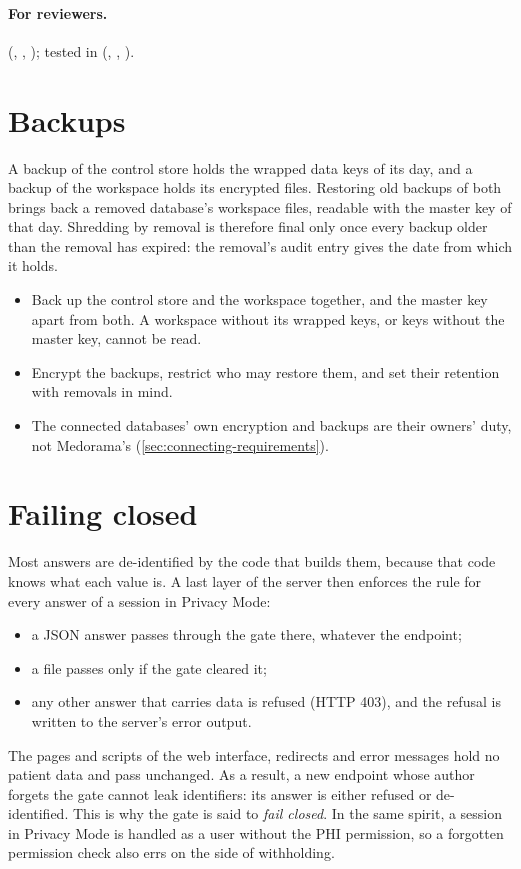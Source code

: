 \paragraph{For reviewers.}  (, ,
); tested in 
(, ,
).

\section{Backups}
\label{sec:protecting-backups}

A backup of the control store holds the wrapped data keys of its day, and a backup of the
workspace holds its encrypted files. Restoring old backups of both brings back a removed
database's workspace files, readable with the master key of that day. Shredding by removal is
therefore final only once every backup older than the removal has expired: the removal's audit
entry gives the date from which it holds.
\begin{itemize}
\item Back up the control store and the workspace together, and the master key apart from both.
  A workspace without its wrapped keys, or keys without the master key, cannot be read.
\item Encrypt the backups, restrict who may restore them, and set their retention with removals in
  mind.
\item The connected databases' own encryption and backups are their owners' duty, not
  Medorama's (\cref{sec:connecting-requirements}).
\end{itemize}

\section{Failing closed}
\label{sec:protecting-fail-closed}

Most answers are de-identified by the code that builds them, because that code knows what each
value is. A last layer of the server then enforces the rule for every answer of a session in
Privacy Mode:
\begin{itemize}
\item a JSON answer passes through the gate there, whatever the endpoint;
\item a file passes only if the gate cleared it;
\item any other answer that carries data is refused (HTTP 403), and the refusal is written to the
  server's error output.
\end{itemize}
The pages and scripts of the web interface, redirects and error messages hold no patient data and
pass unchanged. As a result, a new endpoint whose author forgets the gate cannot leak identifiers:
its answer is either refused or de-identified. This is why the gate is said to \emph{fail
closed}. In the same spirit, a session in Privacy Mode is handled as a user without the PHI
permission, so a forgotten permission check also errs on the side of withholding.

